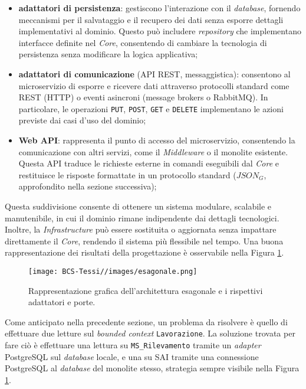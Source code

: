         \begin{itemize}
            \item \textbf{adattatori di persistenza}: gestiscono l'interazione con il \textit{database}, fornendo meccanismi per il salvataggio e il recupero dei dati senza esporre dettagli implementativi al dominio. Questo può includere \textit{repository} che implementano interfacce definite nel \textit{Core}, consentendo di cambiare la tecnologia di persistenza senza modificare la logica applicativa;
            \item \textbf{adattatori di comunicazione} (API REST, messaggistica): consentono al microservizio di esporre e ricevere dati attraverso protocolli standard come REST (HTTP) o eventi asincroni (message brokers o RabbitMQ). In particolare, le operazioni \texttt{PUT}, \texttt{POST}, \texttt{GET} e \texttt{DELETE} implementano le azioni previste dai casi d'uso del dominio;
            \item \textbf{Web API}: rappresenta il punto di accesso del microservizio, consentendo la comunicazione con altri servizi, come il \textit{Middleware} o il monolite esistente. Questa API traduce le richieste esterne in comandi eseguibili dal \textit{Core} e restituisce le risposte formattate in un protocollo standard ($JSON_G$, approfondito nella sezione successiva);
        \end{itemize}

        \vspace{0.2 em}
        \noindent Questa suddivisione consente di ottenere un sistema modulare, scalabile e manutenibile, in cui il dominio rimane indipendente dai dettagli tecnologici. Inoltre, la \textit{Infrastructure} può essere sostituita o aggiornata senza impattare direttamente il \textit{Core}, rendendo il sistema più flessibile nel tempo. Una buona rappresentazione dei risultati della progettazione è osservabile nella Figura \ref{fig:esagonale}. 
        
        \begin{figure}[H]
            \centering
            \texttt{[image: BCS-Tessi//images/esagonale.png]}
            \caption[Rappresentazione dell'architettura esagonale]{Rappresentazione grafica dell'architettura esagonale e i rispettivi adattatori e porte.}
            \label{fig:esagonale}
        \end{figure}


        \vspace{0.2 em}
        \noindent Come anticipato nella precedente sezione, un problema da risolvere è quello di effettuare due letture sul \textit{bounded context} \texttt{Lavorazione}. La soluzione trovata per fare ciò è effettuare una lettura su \texttt{MS\_Rilevamento} tramite un \textit{adapter} PostgreSQL sul \textit{database} locale, e una su SAI tramite una connessione PostgreSQL al \textit{database} del monolite stesso, strategia sempre visibile nella Figura \ref{fig:esagonale}. 
        
